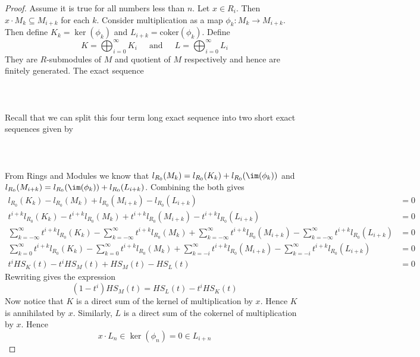 \documentclass[a4paper]{article}
\begin{document}
\begin{prp}{}{}
\begin{proof}
Assume it is true for all numbers less than $n$. Let $x\in R_i$. Then $x\cdot M_k\subseteq M_{i+k}$ for each $k$. Consider multiplication as a map $\phi_k:M_k\to M_{i+k}$. Then define $K_k=\ker(\phi_k)$ and $L_{i+k}=\text{coker}(\phi_k)$. Define $$K=\bigoplus_{i=0}^\infty K_i\;\;\;\;\text{ and }\;\;\;\;L=\bigoplus_{i=0}^\infty L_i$$ They are $R$-submodules of $M$ and quotient of $M$ respectively and hence are finitely generated. The exact sequence \\~\\
 \\~\\
Recall that we can split this four term long exact sequence into two short exact sequences given by \\~\\
 \\~\\
From Rings and Modules we know that $l_{R_0}(M_k)=l_{R_0}(K_k)+l_{R_0}(\im(\phi_k))$ and $l_{R_0}(M_{i+k})=l_{R_0}(\im(\phi_k))+l_{R_0}(L_{i+k})$. Combining the both gives 
\begin{align*}
l_{R_0}(K_k)-l_{R_0}(M_k)+l_{R_0}(M_{i+k})-l_{R_0}(L_{i+k})&=0\\
t^{i+k}l_{R_0}(K_k)-t^{i+k}l_{R_0}(M_k)+t^{i+k}l_{R_0}(M_{i+k})-t^{i+k}l_{R_0}(L_{i+k})&=0\\
\sum_{k=-\infty}^\infty t^{i+k}l_{R_0}(K_k)-\sum_{k=-\infty}^\infty t^{i+k}l_{R_0}(M_k)+\sum_{k=-\infty}^\infty t^{i+k}l_{R_0}(M_{i+k})-\sum_{k=-\infty}^\infty t^{i+k}l_{R_0}(L_{i+k})&=0\\
\sum_{k=0}^\infty t^{i+k}l_{R_0}(K_k)-\sum_{k=0}^\infty t^{i+k}l_{R_0}(M_k)+\sum_{k=-i}^\infty t^{i+k}l_{R_0}(M_{i+k})-\sum_{k=-i}^\infty t^{i+k}l_{R_0}(L_{i+k})&=0\\
t^iHS_K(t)-t^iHS_M(t)+HS_M(t)-HS_L(t)&=0
\end{align*}
Rewriting gives the expression $$(1-t^i)HS_M(t)=HS_L(t)-t^iHS_K(t)$$ Now notice that $K$ is a direct sum of the kernel of multiplication by $x$. Hence $K$ is annihilated by $x$. Similarly, $L$ is a direct sum of the cokernel of multiplication by $x$. Hence $$x\cdot L_n\in\ker(\phi_n)=0\in L_{i+n}$$
\end{proof}
\end{prp}
\end{document}
